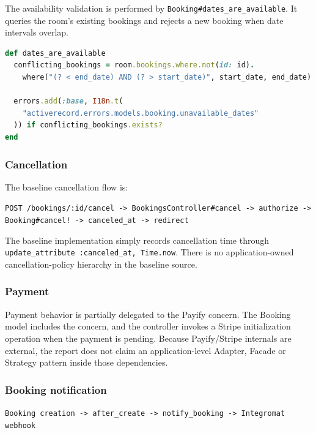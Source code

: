 \documentclass[10pt,a4paper]{article}
\newcommand{\code}[1]{\texttt{\small #1}}
\begin{document}
The availability validation is performed by \code{Booking\#dates\_are\_available}. It queries the room's existing bookings and rejects a new booking when date intervals overlap.

\begin{lstlisting}[language=Ruby,caption={Verified baseline excerpt: booking availability validation}]
def dates_are_available
  conflicting_bookings = room.bookings.where.not(id: id).
    where("(? < end_date) AND (? > start_date)", start_date, end_date)

  errors.add(:base, I18n.t(
    "activerecord.errors.models.booking.unavailable_dates"
  )) if conflicting_bookings.exists?
end
\end{lstlisting}

\subsubsection{Cancellation}

The baseline cancellation flow is:

\begin{center}
\code{POST /bookings/:id/cancel -> BookingsController\#cancel -> authorize -> Booking\#cancel! -> canceled\_at -> redirect}
\end{center}

The baseline implementation simply records cancellation time through \code{update\_attribute :canceled\_at, Time.now}. There is no application-owned cancellation-policy hierarchy in the baseline source.

\subsubsection{Payment}

Payment behavior is partially delegated to the Payify concern. The Booking model includes the concern, and the controller invokes a Stripe initialization operation when the payment is pending. Because Payify/Stripe internals are external, the report does not claim an application-level Adapter, Facade or Strategy pattern inside those dependencies.

\subsubsection{Booking notification}

\begin{center}
\code{Booking creation -> after\_create -> notify\_booking -> Integromat webhook}
\end{center}
\end{document}
